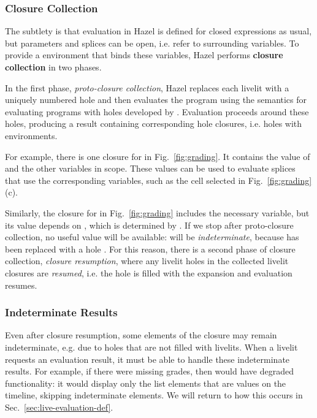 \subsubsection{Closure Collection}\label{sec:closure-collection-example} The subtlety is that 
evaluation in Hazel is defined for closed expressions as usual,
but parameters and splices can be open, i.e. refer to surrounding variables. 
To provide a environment that binds these variables, 
Hazel performs \textbf{closure collection} in two phases.

In the first phase, \emph{proto-closure collection}, 
Hazel replaces each livelit with a uniquely numbered hole and then evaluates the program 
using the semantics for evaluating programs with holes developed by \citet{HazelnutLive}.
Evaluation proceeds around these holes, producing a result containing 
corresponding hole closures, i.e. holes with environments.

For example, there is one closure for  in Fig.~\ref{fig:grading}.
It contains the value of  and the other variables in scope. 
These values can be used to evaluate 
splices that use the corresponding variables, such as the cell selected in Fig.~\ref{fig:grading}(c). 

Similarly, the closure for  in Fig.~\ref{fig:grading} includes 
the necessary  variable, but 
its value depends on , which is determined by . 
If we stop after proto-closure collection,
no useful value will be available:
 will be \emph{indeterminate}, because  has been replaced with a hole \cite{HazelnutLive}.
For this reason, there is a second phase of closure collection, \emph{closure resumption}, 
where any livelit holes 
in the collected livelit closures are \emph{resumed}, i.e. the hole is filled with the expansion 
 and evaluation resumes.


\subsubsection{Indeterminate Results}
Even after closure resumption, some elements of the closure may remain indeterminate, e.g. due to holes that 
are not filled with livelits. 
When a livelit requests an evaluation result, it must be able to handle these indeterminate results.
For example, if there were missing grades,
then  would have degraded functionality: 
it would display only the list elements that are values on the timeline, skipping indeterminate elements.
We will return to how this occurs in Sec.~\ref{sec:live-evaluation-def}.




